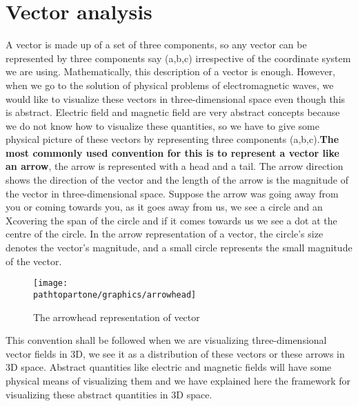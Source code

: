 \section{Vector analysis}
A vector is made up of a set of three components, so any vector can be represented by three components say (a,b,c) irrespective of the coordinate system we are using. Mathematically, this description of a vector is enough. However, when we go to the solution of physical problems of electromagnetic waves, we would like to visualize these vectors in three-dimensional space even though this is abstract. Electric field and magnetic field are very abstract concepts because we do not know how to visualize these quantities, so we have to give some physical picture of these vectors by representing three components (a,b,c).\textbf{The most commonly used convention for this is to represent a vector like an arrow}, the arrow is represented with a head and a tail. The arrow direction shows the direction of the vector and the length of the arrow is the magnitude of the vector in three-dimensional space. Suppose the arrow was going away from you or coming towards you, as it goes away from us, we see a circle and an \textgravedbl X\textacutedbl covering the span of the circle and if it comes towards us we see a dot at the centre of the circle. In the arrow representation of a vector, the circle's size denotes the vector's magnitude, and a small circle represents the small magnitude of the vector.
\begin{figure}[h]
\centering
\texttt{[image: \\pathtopartone/graphics/arrowhead]}
\caption{The arrowhead representation of vector}
\end{figure}

This convention shall be followed when we are visualizing three-dimensional vector fields in 3D, we see it as a distribution of these vectors or these arrows in 3D space. Abstract quantities like electric and magnetic fields will have some physical means of visualizing them and we have explained here the framework for visualizing these abstract quantities in 3D space.  

